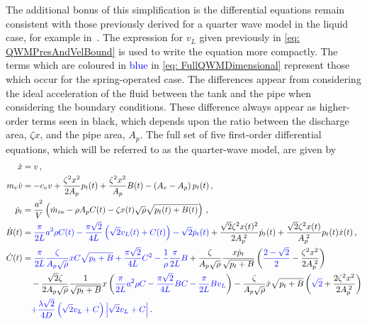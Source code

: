 The additional bonus of this simplification is the differential equations remain consistent with those previously derived for a quarter wave model in the liquid case, for example in~\cite{Hos2015ModelPipe}. The expression for $v_L$ given previously in \cref{eq: QWMPresAndVelBound} is used to write the equation more compactly. The terms which are coloured in \textcolor{Blue}{blue} in \cref{eq: FullQWMDimensional} represent those which occur for the spring-operated case. The differences appear from considering the ideal acceleration of the fluid between the tank and the pipe when considering the boundary conditions. These difference always appear as higher-order terms seen in black, which depends upon the ratio between the discharge area, $\zeta x$, and the pipe area, $A_p$.  The full set of five first-order differential equations, which will be referred to as the quarter-wave model, are given by
~
\begin{equation} \label{eq: FullQWMDimensional}
\begin{split}
    \dot{x} &= v \, , \\
    m_v \dot{v} &= - c_v v + \frac{\zeta^2 x^2}{2 A_p} p_t(t) + \frac{\zeta^2 x^2}{A_p} B(t) - \left( A_v - A_p \right) p_t(t)
    \, , \\
    \dot{p}_t &= \frac{a^2}{V} \left( \dot{m}_{in} - \rho A_p C(t) - \zeta x(t) \sqrt{\rho} \sqrt{p_t(t) + B(t)} \right)
    \, , \\
    \dot{B}(t) &= \textcolor{Blue}{
    \frac{\pi}{2L} a^2 \rho C(t) - \frac{\pi \sqrt{2}}{4L} \left( \sqrt{2} v_L(t) + C(t) \right) - \sqrt{2} \dot{p}_t(t)} + \frac{\sqrt{2} \zeta^2 x(t)^2}{2 A_p\power{2}} \dot{p}_t(t) + \frac{\sqrt{2} \zeta^2 x(t)}{A_p\power{2}} p_t(t) \dot{x}(t)
    \, , \\
    \dot{C}(t) &=
    \textcolor{Blue}{
    \frac{\pi}{2L} \frac{\zeta}{A_p \sqrt{\rho}} x C \sqrt{p_t + B}
    + \frac{\pi \sqrt{2}}{4 L} C^2
    - \frac{1}{\rho} \frac{\pi}{2L} B
    }
    + \frac{\zeta}{A_p \sqrt{\rho}} \frac{x \dot{p}_t}{\sqrt{p_t+B}} \left( 
    \textcolor{Blue}{\frac{2 - \sqrt{2}}{2}} -
    \frac{\zeta^2 x^2}{2 A_p\power{2}} \right)
    \\ & \quad %
    - \frac{\sqrt{2} \zeta}{2 A_p \sqrt{\rho}} \frac{1}{\sqrt{p_t+B}} x \left(
    \textcolor{Blue}{
    \frac{\pi}{2L} a^2 \rho C
    - \frac{\pi \sqrt{2}}{4 L} B C
    - \frac{\pi}{2L} B v_L }
    \right)
    - \frac{\zeta}{A_p \sqrt{\rho}} \dot{x} \sqrt{p_t + B} \left( 
    \textcolor{Blue}{\sqrt{2}} +
    \frac{2 \zeta^2 x^2}{2 A_p\power{2}}
    \right)
    \\ & \quad %
    \textcolor{Blue}{
    + \frac{\lambda \sqrt{2}}{4 D} \left( \sqrt{2} v_L + C \right) \left| \sqrt{2} v_L + C \right| }
    \, .
\end{split}
\end{equation}

